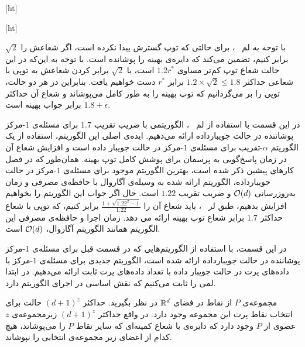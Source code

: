 [ht]



[ht]

با توجه به لم ~، برای حالتی که توپ گسترش پیدا نکرده است، اگر شعاعش را $\sqrt{2}$ برابر کنیم، تضمین می‌کند که دایره‌ی بهینه را پوشانده است. با توجه به این‌که در این حالت شعاع توپ کم‌تر  مساوی $1.2r^*$ است، با $\sqrt{2}$ برابر کردن شعاعش به توپی با شعاعی حداکثر $1.2 \times \sqrt{2} \leq 1.8$ برابر $r^*$ دست خواهیم یافت. بنابراین در هر دو حالت، توپی را بر می‌گردانیم که توپ بهینه را به طور کامل می‌پوشاند و شعاع آن حداکثر $1.8 + \epsilon$ برابر جواب بهینه است.


در این قسمت با استفاده از‌ لم ~، الگوریتمی با ضریب تقریب $1.7$ برای مسئله‌ی $1$-مرکز پوشاننده در حالت جویبارداده ارائه می‌دهیم. ایده‌ی اصلی این الگوریتم، استفاده از یک الگوریتم $\alpha$-تقریب برای مسئله‌ی $1$-مرکز در حالت جویبار داده است و افزایش شعاع آن در زمان پاسخ‌گویی به پرسمان برای پوشش کامل توپ بهینه. همان‌طور که در فصل کارهای پیشین ذکر شده است، بهترین الگوریتم موجود برای مسئله‌ی $1$-مرکز در حالت جویبارداده، الگوریتم ارائه شده به وسیله‌ی آگاروال با حافظه‌ی مصرفی و زمان به‌روزرسانی $\mathcal{O}(d)$ و ضریب تقریب $1.22$ است.
حال اگر جواب این الگوریتم را بخواهیم افزایش بدهیم، طبق‌ لر ~، باید شعاع آن را $\frac{1 + \sqrt{1.22^2 - 1}}{1.22}$ برابر کنیم، که توپی با شعاع حداکثر $1.7$ برابر شعاع توپ بهینه ارائه می دهد. زمان اجرا و حافظه‌ی مصرفی این الگوریتم همانند الگوریتم آگاروال، $\mathcal{O}(d)$ است.


در این قسمت، با استفاده از الگوریتم‌هایی که در قسمت قبل برای مسئله‌ی $1$-مرکز پوشاننده در حالت جویبارداده ارائه شده است، الگوریتم جدیدی برای مسئله‌ی $1$-مرکز با داده‌های پرت در حالت جویبار داده با تعداد داده‌های پرت ثابت ارائه می‌دهیم. در ابتدا لمی را ثابت می‌کنیم که نقش اساسی در اجرای الگوریتم دارد.


مجموعه‌ی $P$ از نقاط در فضای $\mathbb{R}^d$ در نظر بگیرید. حداکثر $(d+1)^z$ حالت برای انتخاب نقاط پرت این مجموعه وجود دارد. در واقع حداکثر $(d+1)^z$ زیرمجموعه‌ی $z$ عضوی از $P$ وجود دارد که دایره‌ی با شعاع کمینه‌ای که سایر نقاط $P$ را می‌پوشاند، هیچ کدام از اعضای زیر مجموعه‌ی انتخابی را نپوشاند.


